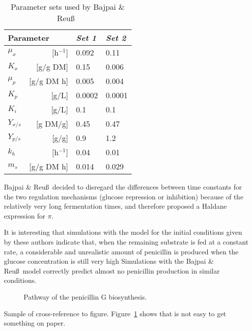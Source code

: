 \documentclass[joc]{ipart}
\theoremstyle{plain}
\begin{document}
\begin{table}
\centering
\tablewidth=6.1cm
\caption{Parameter sets used by Bajpai \& Reu\ss\ }\label{parset}
\begin{tabular}{lrll}
\hline
\multicolumn{2}{l}{Parameter} & {\it Set 1} & {\it Set 2}\\
\hline
$\mu_{x}$           & [h$^{-1}$]  & 0.092       & 0.11          \\
$K_{x}$             & [g/g DM]     & 0.15        & 0.006         \\
$\mu_{p}$           & [g/g DM h]  & 0.005       & 0.004         \\
$K_{p}$             & [g/L]        & 0.0002      & 0.0001        \\
$K_{i}$             & [g/L]        & 0.1         & 0.1           \\
$Y_{x/s}$           & [g DM/g]     & 0.45        & 0.47          \\
$Y_{p/s}$           & [g/g]        & 0.9         & 1.2           \\
$k_{h}$             & [h$^{-1}$]  & 0.04        & 0.01          \\
$m_{s}$             & [g/g DM h]  & 0.014       & 0.029         \\
\hline
\end{tabular}
\end{table}

Bajpai \& Reu\ss\ decided to disregard the
differences between time constants for the two regulation mechanisms
(glucose repression or inhibition) because of the
relatively very long fermentation times, and therefore proposed a Haldane
expression for $\pi$.

It is interesting that simulations with the \cite{r4} model for the
initial conditions given by these authors indicate that, when the
remaining substrate is fed at a constant rate, a considerable and
unrealistic amount of penicillin is
produced when the glucose concentration is still very high \cite{r2,r3,r4}
Simulations with the Bajpai \& Reu\ss\ model correctly predict almost
no penicillin production in similar conditions.

\begin{figure} %
\vspace{6pc}
\caption[]{Pathway of the penicillin G biosynthesis.}
\label{penG}
\end{figure}

Sample of cross-reference to figure.
Figure~\ref{penG} shows that is not easy to get something on paper.
\end{document}
